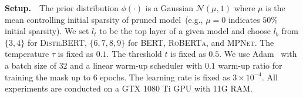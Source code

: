\noindent
\textbf{Setup.}~~The prior distribution $\phi(\cdot)$ is a Gaussian $\mathcal{N}(\mu, 1)$ where $\mu$ is the mean controlling initial sparsity of pruned model~(e.g., $\mu=0$ indicates $50\%$ initial sparsity).
We set $l_t$ to be the top layer of a given model 
and choose $l_b$ from $\{3,4\}$ for \textsc{DistilBERT}, $\{6,7,8,9\}$ for \textsc{BERT}, \textsc{RoBERTa}, 
and \textsc{MPNet}. The temperature $\tau$ is fixed as $0.1$. The threshold $t$ is fixed as $0.5$. 
We use Adam~\citep{kingma2014method} with a batch size of $32$ and a linear warm-up scheduler 
with $0.1$ warm-up ratio for training the mask up to $6$ epochs. 
The learning rate is fixed as $3\times 10^{-4}$. All experiments are conducted on a GTX 1080 Ti GPU with 11G RAM.


